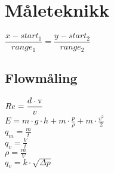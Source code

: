 \section{Måleteknikk}
$\dfrac{x-start_1}{range_1}=\dfrac{y-start_2}{range_2}$
\subsection*{Flowmåling}
$Re=\dfrac {d \cdot \text v}{v}$\\
$E=m\cdot g\cdot h+m\cdot \frac{p}{\rho}+m\cdot \frac {v^2}{2} $\\
$q_m=\frac{m}{t}$\\
$q_v=\frac{V}{t}$\\
$\rho=\frac{m}{V}$\\
$q_v=k\cdot \sqrt{\Delta p}$\\
